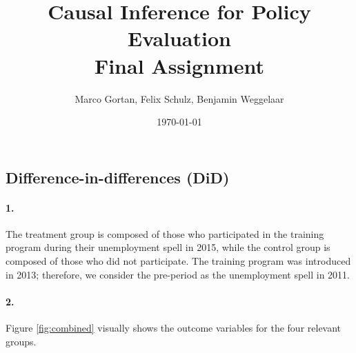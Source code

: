 \documentclass{scrartcl}
\title{Causal Inference for Policy Evaluation\\
\Large{Final Assignment}}
\author{Marco Gortan, Felix Schulz, Benjamin Weggelaar}
\date{\today}
\begin{document}
\maketitle



\subsection*{Difference-in-differences (DiD)}

\paragraph*{1.}
The treatment group is composed of those who participated in the training program during their unemployment spell in 2015, while the control group is composed of those who did not participate. The training program was introduced in 2013; therefore, we consider the pre-period as the unemployment spell in 2011. 

\paragraph*{2.}
Figure \ref{fig:combined} visually shows the outcome variables for the four relevant groups.
\end{document}
